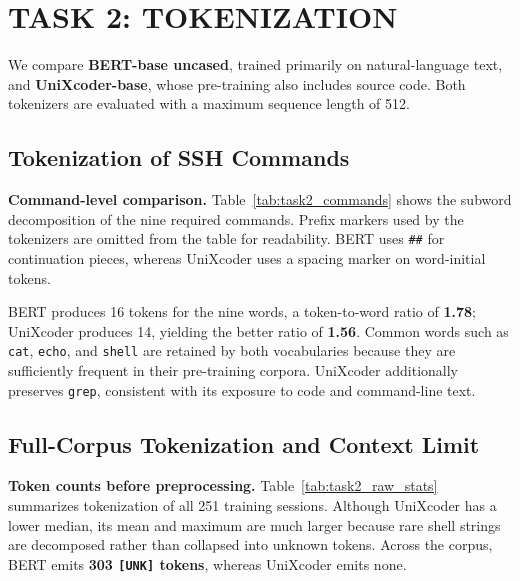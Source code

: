 \section{TASK 2: TOKENIZATION} \label{sec:task2}

We compare \textbf{BERT-base uncased}, trained primarily on natural-language
text, and \textbf{UniXcoder-base}, whose pre-training also includes source
code. Both tokenizers are evaluated with a maximum sequence length of 512.

\subsection{Tokenization of SSH Commands} \label{subsec:task2_commands}

\textbf{Command-level comparison.} Table~\ref{tab:task2_commands} shows the
subword decomposition of the nine required commands. Prefix markers used by the
tokenizers are omitted from the table for readability. BERT uses
\texttt{\#\#} for continuation pieces, whereas UniXcoder uses a spacing marker
on word-initial tokens.

BERT produces 16 tokens for the nine words, a token-to-word ratio of
\textbf{1.78}; UniXcoder produces 14, yielding the better ratio of
\textbf{1.56}. Common words such as \texttt{cat}, \texttt{echo}, and
\texttt{shell} are retained by both vocabularies because they are sufficiently
frequent in their pre-training corpora. UniXcoder additionally preserves
\texttt{grep}, consistent with its exposure to code and command-line text.

\subsection{Full-Corpus Tokenization and Context Limit}
\label{subsec:task2_corpus}

\textbf{Token counts before preprocessing.} Table~\ref{tab:task2_raw_stats}
summarizes tokenization of all 251 training sessions. Although UniXcoder has a
lower median, its mean and maximum are much larger because rare shell strings
are decomposed rather than collapsed into unknown tokens. Across the corpus,
BERT emits \textbf{303 \texttt{[UNK]} tokens}, whereas UniXcoder emits none.

